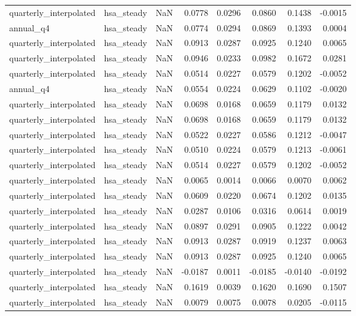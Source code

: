 \begin{tabular}{llrrrrrr}
quarterly\_interpolated & hsa\_steady & NaN & 0.0778 & 0.0296 & 0.0860 & 0.1438 & -0.0015 \\
annual\_q4 & hsa\_steady & NaN & 0.0774 & 0.0294 & 0.0869 & 0.1393 & 0.0004 \\
quarterly\_interpolated & hsa\_steady & NaN & 0.0913 & 0.0287 & 0.0925 & 0.1240 & 0.0065 \\
quarterly\_interpolated & hsa\_steady & NaN & 0.0946 & 0.0233 & 0.0982 & 0.1672 & 0.0281 \\
quarterly\_interpolated & hsa\_steady & NaN & 0.0514 & 0.0227 & 0.0579 & 0.1202 & -0.0052 \\
annual\_q4 & hsa\_steady & NaN & 0.0554 & 0.0224 & 0.0629 & 0.1102 & -0.0020 \\
quarterly\_interpolated & hsa\_steady & NaN & 0.0698 & 0.0168 & 0.0659 & 0.1179 & 0.0132 \\
quarterly\_interpolated & hsa\_steady & NaN & 0.0698 & 0.0168 & 0.0659 & 0.1179 & 0.0132 \\
quarterly\_interpolated & hsa\_steady & NaN & 0.0522 & 0.0227 & 0.0586 & 0.1212 & -0.0047 \\
quarterly\_interpolated & hsa\_steady & NaN & 0.0510 & 0.0224 & 0.0579 & 0.1213 & -0.0061 \\
quarterly\_interpolated & hsa\_steady & NaN & 0.0514 & 0.0227 & 0.0579 & 0.1202 & -0.0052 \\
quarterly\_interpolated & hsa\_steady & NaN & 0.0065 & 0.0014 & 0.0066 & 0.0070 & 0.0062 \\
quarterly\_interpolated & hsa\_steady & NaN & 0.0609 & 0.0220 & 0.0674 & 0.1202 & 0.0135 \\
quarterly\_interpolated & hsa\_steady & NaN & 0.0287 & 0.0106 & 0.0316 & 0.0614 & 0.0019 \\
quarterly\_interpolated & hsa\_steady & NaN & 0.0897 & 0.0291 & 0.0905 & 0.1222 & 0.0042 \\
quarterly\_interpolated & hsa\_steady & NaN & 0.0913 & 0.0287 & 0.0919 & 0.1237 & 0.0063 \\
quarterly\_interpolated & hsa\_steady & NaN & 0.0913 & 0.0287 & 0.0925 & 0.1240 & 0.0065 \\
quarterly\_interpolated & hsa\_steady & NaN & -0.0187 & 0.0011 & -0.0185 & -0.0140 & -0.0192 \\
quarterly\_interpolated & hsa\_steady & NaN & 0.1619 & 0.0039 & 0.1620 & 0.1690 & 0.1507 \\
quarterly\_interpolated & hsa\_steady & NaN & 0.0079 & 0.0075 & 0.0078 & 0.0205 & -0.0115 \\
\bottomrule
\end{tabular}
